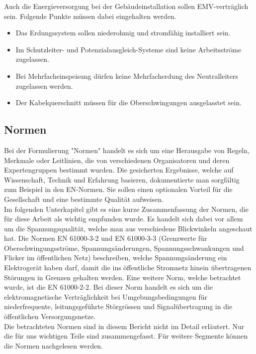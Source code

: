 Auch die Energieversorgung bei der Gebäudeinstallation sollen EMV-verträglich sein. Folgende Punkte müssen dabei eingehalten werden. 

\begin{itemize}
	\item Das Erdungssystem sollen niederohmig und stromfähig installiert sein.
	\item Im Schutzleiter- und Potenzialausgleich-Systeme sind keine Arbeitsströme zugelassen.
	\item Bei Mehrfacheinspeisung dürfen keine Mehrfacherdung des Neutralleiters zugelassen werden.
	\item Der Kabelquerschnitt müssen für die Oberschwingungen ausgelasstet sein.
\end{itemize}  



\subsection{Normen}
Bei der Formulierung "Normen" handelt es sich um eine Herausgabe von Regeln, Merkmale oder Leitlinien, die von verschiedenen Organisatoren und deren Expertengruppen bestimmt wurden. Die gesicherten Ergebnisse, welche auf Wissenschaft, Technik und Erfahrung basieren, dokumentierte man sorgfältig zum Beispiel in den EN-Normen. Sie sollen einen optionalen Vorteil für die Gesellschaft und eine bestimmte Qualität aufweisen.\\
Im folgenden Unterkapitel gibt es eine kurze Zusammenfassung der Normen, die für diese Arbeit als wichtig empfunden wurde. Es handelt sich dabei vor allem um die Spannungsqualität, welche man aus verschiedene Blickwinkeln angeschaut hat. Die Normen EN 61000-3-2 und EN 61000-3-3 (Grenzwerte für Oberschwingungsströme, Spannungsänderungen, Spannungsschwankungen und Flicker im öffentlichen Netz) beschreiben, welche Spannungsänderung ein Elektrogerät haben darf, damit die ins öffentliche Stromnetz hinein übertragenen Störungen in Grenzen gehalten werden. Eine weitere Norm, welche betrachtet wurde, ist die EN 61000-2-2. Bei dieser Norm handelt es sich um die elektromagnetische Verträglichkeit bei Umgebungsbedingungen für niederfrequente, leitungsgeführte Störgrössen und Signalübertragung in die öffentlichen Versorgungsnetze.\\
Die betrachteten Normen sind in diesem Bericht nicht im Detail erläutert. Nur die für uns wichtigen Teile sind zusammengefasst. Für weitere Segmente können die Normen nachgelesen werden. 


